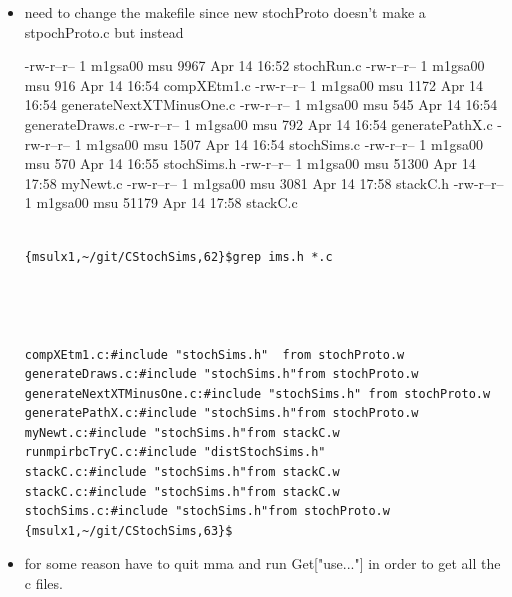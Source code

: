 \documentclass[hyperref]{labbook}
\begin{document}
\begin{itemize}
\item need to change the makefile since new stochProto doesn't make a stpochProto.c but instead 

-rw-r--r-- 1 m1gsa00 msu  9967 Apr 14 16:52 stochRun.c
-rw-r--r-- 1 m1gsa00 msu   916 Apr 14 16:54 compXEtm1.c
-rw-r--r-- 1 m1gsa00 msu  1172 Apr 14 16:54 generateNextXTMinusOne.c
-rw-r--r-- 1 m1gsa00 msu   545 Apr 14 16:54 generateDraws.c
-rw-r--r-- 1 m1gsa00 msu   792 Apr 14 16:54 generatePathX.c
-rw-r--r-- 1 m1gsa00 msu  1507 Apr 14 16:54 stochSims.c
-rw-r--r-- 1 m1gsa00 msu   570 Apr 14 16:55 stochSims.h
-rw-r--r-- 1 m1gsa00 msu 51300 Apr 14 17:58 myNewt.c
-rw-r--r-- 1 m1gsa00 msu  3081 Apr 14 17:58 stackC.h
-rw-r--r-- 1 m1gsa00 msu 51179 Apr 14 17:58 stackC.c
\begin{verbatim}

{msulx1,~/git/CStochSims,62}$grep ims.h *.c




compXEtm1.c:#include "stochSims.h"  from stochProto.w
generateDraws.c:#include "stochSims.h"from stochProto.w
generateNextXTMinusOne.c:#include "stochSims.h" from stochProto.w
generatePathX.c:#include "stochSims.h"from stochProto.w
myNewt.c:#include "stochSims.h"from stackC.w
runmpirbcTryC.c:#include "distStochSims.h"
stackC.c:#include "stochSims.h"from stackC.w
stackC.c:#include "stochSims.h"from stackC.w
stochSims.c:#include "stochSims.h"from stochProto.w
{msulx1,~/git/CStochSims,63}$

\end{verbatim}\item for some reason have to quit mma and run Get["use..."] in order to get all the c files.

\end{itemize}





\end{document}
